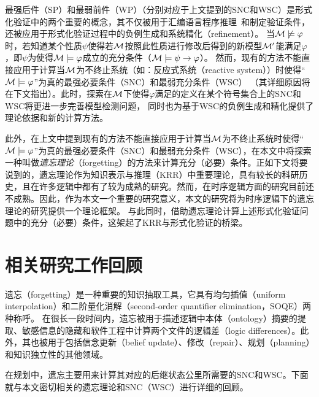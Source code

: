最强后件（SP）和最弱前件（WP）（分别对应于上文提到的SNC和WSC）是形式化验证中的两个重要的概念，其不仅被用于汇编语言程序推理~\cite{legato2002weakest}和制定验证条件\cite{DBLP:journals/ipl/Leino05}，还被应用于形式化验证过程中的负例生成\cite{dailler2018instrumenting}和系统精化（refinement）\cite{woodcock1990refinement}。
当${\cal M}\not \models \varphi$时，若知道某个性质$\psi$使得若${\cal M}$按照此性质进行修改后得到的新模型${\cal M}'$能满足$\varphi$，即$\psi$为使得${\cal M}\models \varphi$成立的充分条件（${\cal M} \models \psi\rightarrow \varphi$）。
然而，现有的方法不能直接应用于计算当${\cal M}$为不终止系统（如：反应式系统（reactive system））时使得“${\cal M}\models \varphi$”为真的最强必要条件（SNC）和最弱充分条件（WSC）
（其详细原因将在下文指出）。此时，探索在${\cal M}$下使得$\varphi$满足的定义在某个符号集合上的SNC和WSC将更进一步完善模型检测问题，
同时也为基于WSC的负例生成和精化提供了理论依据和新的计算方法。

此外，在上文中提到现有的方法不能直接应用于计算当${\cal M}$为不终止系统时使得“${\cal M}\models \varphi$”为真的最强必要条件（SNC）和最弱充分条件（WSC），在本文中将探索一种叫做\emph{遗忘理论}（forgetting）的方法来计算充分（必要）条件。正如下文将要说到的，遗忘理论作为知识表示与推理（KRR）中重要理论，具有较长的科研历史，且在许多逻辑中都有了较为成熟的研究。然而，在时序逻辑方面的研究目前还不成熟。因此，作为本文一个重要的研究意义，本文的研究将为时序逻辑下的遗忘理论的研究提供一个理论框架。
与此同时，借助遗忘理论计算上述形式化验证问题中的充分（必要）条件，这架起了KRR与形式化验证的桥梁。

\section{相关研究工作回顾}

遗忘（forgetting）是一种重要的知识抽取工具，它具有均匀插值（uniform interpolation）和二阶量化消解（second-order quantifier elimination，SOQE）两种称呼。
在很长一段时间内，遗忘被用于描述逻辑中本体（ontology）摘要的提取、敏感信息的隐藏和软件工程中计算两个文件的逻辑差（logic differences）。此外，其也被用于包括信念更新（belief update）、修改（repair）、规划（planning）和知识独立性的其他领域。

在规划中，遗忘主要用来计算其对应的后继状态公里所需要的SNC和WSC。下面就与本文密切相关的遗忘理论和SNC（WSC）进行详细的回顾。




